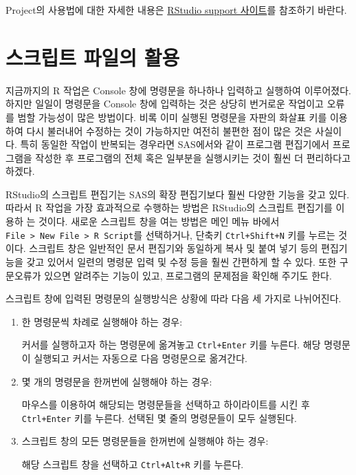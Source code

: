 \documentclass[
]{book}
\begin{document}
Project의 사용법에 대한 자세한 내용은 \href{https://support.rstudio.com}{RStudio support 사이트}를 참조하기 바란다.

\hypertarget{uxc2a4uxd06cuxb9bduxd2b8-uxd30cuxc77cuxc758-uxd65cuxc6a9}{%
\section{스크립트 파일의 활용}\label{uxc2a4uxd06cuxb9bduxd2b8-uxd30cuxc77cuxc758-uxd65cuxc6a9}}

지금까지의 R 작업은 Console 창에 명령문을 하나하나 입력하고 실행하여
이루어졌다. 하지만 일일이 명령문을 Console 창에 입력하는 것은 상당히
번거로운 작업이고 오류를 범할 가능성이 많은 방법이다. 비록 이미 실행된
명령문을 자판의 화살표 키를 이용하여 다시 불러내어 수정하는 것이
가능하지만 여전히 불편한 점이 많은 것은 사실이다. 특히 동일한 작업이
반복되는 경우라면 SAS에서와 같이 프로그램 편집기에서 프로그램을 작성한
후 프로그램의 전체 혹은 일부분을 실행시키는 것이 훨씬 더 편리하다고 하겠다.

RStudio의 스크립트 편집기는 SAS의 확장 편집기보다 훨씬 다양한 기능을
갖고 있다. 따라서 R 작업을 가장 효과적으로 수행하는 방법은 RStudio의
스크립트 편집기를 이용하 는 것이다. 새로운 스크립트 창을 여는 방법은 메인 메뉴
바에서 \texttt{File\ \textgreater{}\ New\ File\ \textgreater{}\ R\ Script}를 선택하거나, 단축키 \texttt{Ctrl+Shift+N}
키를 누르는 것이다. 스크립트 창은 일반적인 문서 편집기와 동일하게 복사
및 붙여 넣기 등의 편집기능을 갖고 있어서 일련의 명령문 입력 및 수정
등을 훨씬 간편하게 할 수 있다. 또한 구문오류가 있으면 알려주는 기능이
있고, 프로그램의 문제점을 확인해 주기도 한다.

스크립트 창에 입력된 명령문의 실행방식은 상황에 따라 다음 세 가지로
나뉘어진다.

\begin{enumerate}
\def\labelenumi{\arabic{enumi}.}
\item
  한 명령문씩 차례로 실행해야 하는 경우:

  커서를 실행하고자 하는 명령문에 옮겨놓고 \texttt{Ctrl+Enter} 키를 누른다.
  해당 명령문이 실행되고 커서는 자동으로 다음 명령문으로 옮겨간다.
\item
  몇 개의 명령문을 한꺼번에 실행해야 하는 경우:

  마우스를 이용하여 해당되는 명령문들을 선택하고 하이라이트를 시킨 후
  \texttt{Ctrl+Enter} 키를 누른다. 선택된 몇 줄의 명령문들이 모두 실행된다.
\item
  스크립트 창의 모든 명령문들을 한꺼번에 실행해야 하는 경우:

  해당 스크립트 창을 선택하고 \texttt{Ctrl+Alt+R} 키를 누른다.
\end{enumerate}
\end{document}
